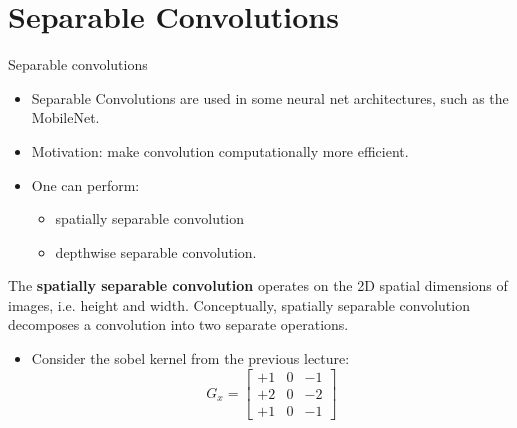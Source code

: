 \documentclass[11pt,compress,t,notes=noshow, xcolor=table]{beamer}
\begin{document}


\section{Separable Convolutions}

 \begin{vbframe}{Separable convolutions}
     \begin{itemize}
         \item Separable Convolutions are used in some neural net architectures, such as the MobileNet.
         \item Motivation: make convolution computationally more efficient.
         \item One can perform:
               \begin{itemize}
                   \item spatially separable convolution 
                   \item depthwise separable convolution.
                \end{itemize}
      \end{itemize}
      The \textbf{spatially separable convolution} operates on the 2D spatial dimensions of images, i.e. height and width. Conceptually, spatially separable convolution decomposes a convolution into two separate operations.
      \begin{itemize}   
         \item Consider the sobel kernel from the previous lecture:
             \begin{equation*}
                     G_x = 
                     \begin{bmatrix}
                         +1 & 0 & -1 \\
                         +2 & 0 & -2 \\
                         +1 & 0 & -1 
                     \end{bmatrix}
             \end{equation*}

\end{itemize}
\end{vbframe}
\end{document}
